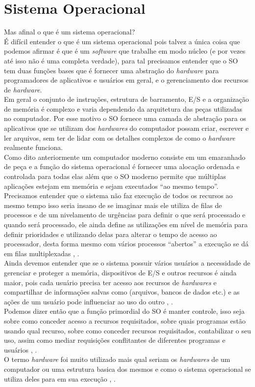 \chapter[Sistema Operacional]{Sistema Operacional}

Mas afinal o que é um sistema operacional?\\
É difícil entender o que é um sistema operacional pois talvez a única coisa que podemos afirmar é que é um \emph{software} que trabalhe em modo núcleo (e por vezes até isso não é uma completa verdade), para tal precisamos entender que o SO tem duas funções bases que é fornecer uma abstração do \emph{hardware} para programadores de aplicativos e usuários em geral, e o gerenciamento dos recursos de \emph{hardware}.\\
 Em geral o conjunto de instruções, estrutura de barramento, E/S e a organização de memória é complexo e varia dependendo da arquitetura das peças utilizadas no computador. Por esse motivo o SO fornece uma camada de abstração para os aplicativos que se utilizam dos \emph{hardwares} do computador possam criar, escrever e ler arquivos, sem ter de lidar com os detalhes complexos de como o \emph{hardware} realmente funciona.\\
Como dito anteriormente um computador moderno consiste em um emaranhado de peça e a função do sistema operacional é fornecer uma alocação ordenada e controlada para todas elas além que o SO moderno permite que múltiplas aplicações estejam em memória e sejam executados “ao mesmo tempo”. \\
Precisamos entender que o sistema não faz  execução de todos os recursos ao mesmo tempo isso seria insano de se imaginar mais ele utiliza de filas de processos e de um nivelamento de urgências para definir o que será processado e quando será processado, ele ainda define as utilizações em nível de memória para definir prioridades e utilizando delas para alterar o tempo  de acesso ao processador, desta forma mesmo com vários processos “abertos” a execução se dá em filas multiplexadas \cite{Tanenbaum2016}, \cite{Comer2012}.\\
Ainda devemos entender que se o sistema possuir vários usuários a necessidade de gerenciar e proteger a memória, dispositivos de E/S e outros recursos é ainda maior, pois cada usuário precisa ter acesso aos recursos de \emph{hardwares} e compartilhar de informações salvas como (arquivos, bancos de dados etc.) e as ações de um usuário pode influenciar ao uso do outro \cite{Tanenbaum2016}, \cite{Comer2012}.\\
Podemos dizer então que a função primordial do SO é manter controle, isso seja sobre como conceder acesso a recursos requisitados, sobre quais programas estão usando qual recurso, sobre como conceder recursos requisitados, contabilizar o seu uso, assim como mediar requisições conflitantes de diferentes programas e usuários \cite{Tanenbaum2016}, \cite{Comer2012}.\\
O termo \emph{hardware} foi muito utilizado mais qual seriam os \emph{hardwares} de um computador ou uma estrutura basica dos mesmos e como o sistema operacional se utiliza deles para em sua execução \cite{Tanenbaum2016}, \cite{Comer2012}.

